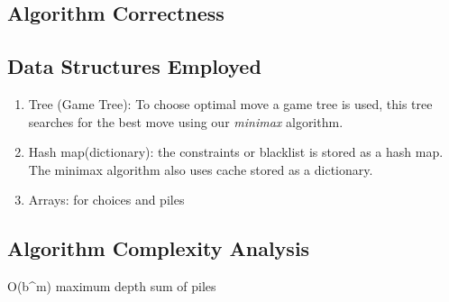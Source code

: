 \documentclass{article}
\begin{document}
\subsection*{Algorithm Correctness}

\subsection*{Data Structures Employed}
\begin{enumerate}
  \item Tree (Game Tree): To choose optimal move a game tree is used, this tree searches for the best move using our \textit{minimax} algorithm. 
  \item Hash map(dictionary): the constraints or blacklist is stored as a hash map. The minimax algorithm also uses cache stored as a dictionary. 
  \item Arrays: for choices and piles
\end{enumerate}
\subsection*{Algorithm Complexity Analysis}
O(b^m)
maximum depth sum of piles
\end{document}
